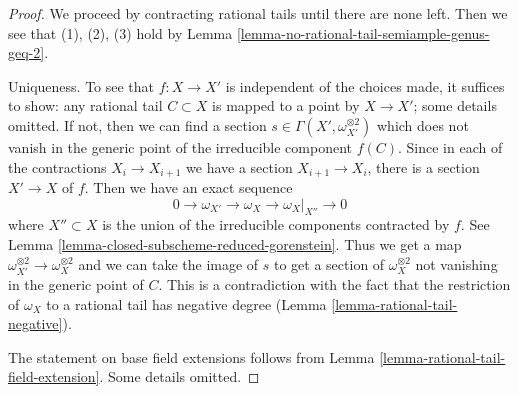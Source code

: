 \begin{proof}
We proceed by contracting rational tails until there are none
left. Then we see that (1), (2), (3) hold by
Lemma \ref{lemma-no-rational-tail-semiample-genus-geq-2}.

\medskip\noindent
Uniqueness. To see that $f : X \to X'$ is independent of the choices
made, it suffices to show: any rational tail $C \subset X$ is
mapped to a point by $X \to X'$; some details omitted.
If not, then we can find a section
$s \in \Gamma(X', \omega_{X'}^{\otimes 2})$ which does
not vanish in the generic point of the irreducible component $f(C)$.
Since in each of the contractions $X_i \to X_{i + 1}$
we have a section $X_{i + 1} \to X_i$, there is a section
$X' \to X$ of $f$. Then we have an exact sequence
$$
0 \to \omega_{X'} \to \omega_X \to \omega_X|_{X''} \to 0
$$
where $X'' \subset X$ is the union of the irreducible components
contracted by $f$. See Lemma \ref{lemma-closed-subscheme-reduced-gorenstein}.
Thus we get a map $\omega_{X'}^{\otimes 2} \to \omega_X^{\otimes 2}$
and we can take the image of $s$ to get a section of
$\omega_X^{\otimes 2}$ not vanishing in the generic point of $C$.
This is a contradiction with the fact that the restriction of
$\omega_X$ to a rational tail has negative degree
(Lemma \ref{lemma-rational-tail-negative}).

\medskip\noindent
The statement on base field extensions follows from
Lemma \ref{lemma-rational-tail-field-extension}. Some details omitted.
\end{proof}

